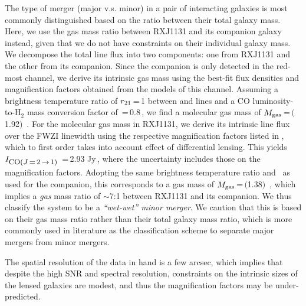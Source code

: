 \documentclass[]{emulateapj}
\begin{document}
The type of merger (major v.s. minor) in a pair of interacting galaxies 
is most commonly distinguished based on 
the ratio between their total galaxy mass.
Here, we use the gas mass ratio between RXJ1131 and
its companion galaxy instead, given that we do not have constraints on their individual galaxy mass.
We decompose the total line flux into two components:
one from RXJ1131 and the other from its companion.
Since the companion is only detected in the red-most channel, we
derive its intrinsic gas mass using the best-fit flux 
densities and magnification factors obtained from the models of this channel.
Assuming a brightness temperature ratio 
of $r_{\rm 21}$\,=\,1 between \bco and \aco lines and
a CO luminosity-to-H$_2$ mass conversion factor of
\alphaco\,=\,0.8\,\alphaU, we find
a molecular gas mass of $M_{\rm gas}$\,=\,$($1.92$)$\, \Msun.
For the molecular gas mass in RXJ1131, we derive
its intrinsic line flux over the FWZI linewidth
using the respective magnification
factors listed in , which to
first order takes into account effect of differential lensing.
This yields $I_{\small \mbox{CO($J$\,=\,2\,$\rightarrow$\,1) }}$\,=\,2.93 Jy\,\kms,
where the uncertainty includes those on
the magnification factors.
Adopting the same brightness temperature ratio and \alphaco\ as
used for the companion, this corresponds to a gas mass of
$M_{\rm gas}$\,=\,$($1.38$)$\, \Msun, which
implies a {\em gas} mass ratio of $\sim$7:1 between RXJ1131 and its companion.
We thus classify the system to be a {\em ``wet-wet'' minor merger}.
We caution that this is based on their gas mass ratio rather than their total galaxy mass ratio, which 
is more commonly used in literature as the
classification scheme to separate major mergers from minor mergers. 

The spatial resolution of the data in hand
is a few arcsec, which implies that despite the high SNR and spectral
resolution, constraints on the intrinsic sizes of the lensed galaxies are modest, and thus the magnification
factors may be under-predicted. %
\end{document}
